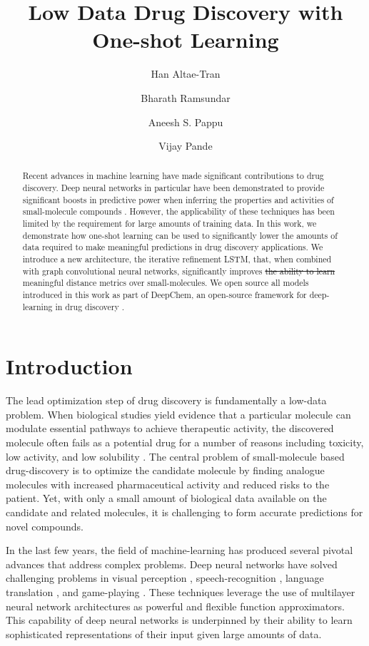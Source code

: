\documentclass[journal=jacsat,manuscript=article]{achemso}
\author{Han Altae-Tran}
\affiliation{Department of Biological Engineering, Massachusetts Institute of Technology}
\author{Bharath Ramsundar}
\affiliation{Department of Computer Science, Stanford University}
\author{Aneesh S. Pappu}
\affiliation{Department of Computer Science, Stanford University}
\author{Vijay Pande}
\affiliation{Department of Chemistry, Stanford University}
\title{Low Data Drug Discovery with One-shot Learning}
\providecommand{\DIFaddtex}[1]{{\protect\color{blue}\uwave{#1}}} %
\providecommand{\DIFdeltex}[1]{{\protect\color{red}\sout{#1}}}                      %
\providecommand{\DIFaddbegin}{} %
\providecommand{\DIFaddend}{} %
\providecommand{\DIFdelbegin}{} %
\providecommand{\DIFdelend}{} %
\providecommand{\DIFadd}[1]{\texorpdfstring{\DIFaddtex{#1}}{#1}} %
\providecommand{\DIFdel}[1]{\texorpdfstring{\DIFdeltex{#1}}{}} %
\begin{document}
\maketitle

\begin{abstract}
Recent advances in machine learning have made significant contributions to drug discovery. Deep neural networks in particular have been demonstrated to provide significant boosts in predictive power when inferring the properties and activities of small-molecule compounds \cite{ma2015deep}. However, the applicability of these techniques has been limited by the requirement for large amounts of training data. In this work, we demonstrate how one-shot learning can be used to significantly lower the amounts of data required to make meaningful predictions in drug discovery applications. We introduce a new architecture, the iterative refinement LSTM, that, when combined with graph convolutional neural networks, significantly improves \DIFdelbegin \DIFdel{the ability to learn }\DIFdelend \DIFaddbegin \DIFadd{learning of }\DIFaddend meaningful distance metrics over small-molecules. We open source all models introduced in this work as part of DeepChem, an open-source framework for deep-learning in drug discovery
\cite{ram2016}.
\end{abstract}

\section{Introduction}
The lead optimization step of drug discovery is fundamentally a low-data problem. When biological studies yield evidence that a particular molecule can modulate essential pathways to achieve therapeutic activity, the discovered molecule often fails as a potential drug for a number of reasons including toxicity, low activity, and low solubility \cite{waring2015analysis}. The central problem of small-molecule based drug-discovery is to optimize the candidate molecule by finding analogue molecules with increased pharmaceutical activity and reduced risks to the patient. Yet, with only a small amount of biological data available on the candidate and related molecules, it is challenging to form accurate predictions for novel compounds.

In the last few years, the field of machine-learning has produced several pivotal advances that address complex problems. Deep neural networks have solved challenging problems in visual perception \cite{ILSVRC15}, speech-recognition \cite{deng2013new}, language translation \cite{wu2016google}, and game-playing \cite{silver2016mastering}. These techniques leverage the use of multilayer neural network architectures as powerful and flexible function approximators. This capability of deep neural networks is underpinned by their ability to learn sophisticated representations of their input given large amounts of data.
\end{document}
